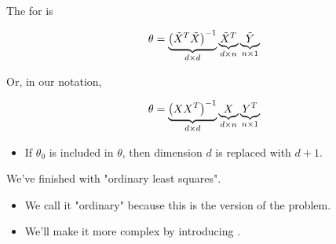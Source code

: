         \begin{kequation}
        
            The  for  is 
            
            \begin{equation*}
                \theta = 
                \underbrace{ 
                \left(  \tilde{X}^T\tilde{X}  \right)  ^{-1}
                }_{d \times d}
                \underbrace{
                \tilde{X}^T
                }_{d \times n}
                \underbrace{
                \tilde{Y}
                }_{n \times 1} 
            \end{equation*}
            
            Or, in our  notation,
            
            \begin{equation*}
                \theta = 
                \underbrace{ 
                \left(  XX^T  \right)  ^{-1}
                }_{d \times d}
                \underbrace{
                X
                }_{d \times n}
                \underbrace{
                Y^T
                }_{n \times 1} 
            \end{equation*}

            \phantom{}

            \begin{itemize}
                \item If $\theta_0$ is included in $\theta$, then dimension $d$ is replaced with $d + 1$.
            \end{itemize}
            
        \end{kequation}


        
        
    We've finished with "ordinary least squares".
    
    \begin{itemize}
        \item We call it "ordinary" because this is the  version of the problem.
        \item We'll make it more complex by introducing .
    \end{itemize}

